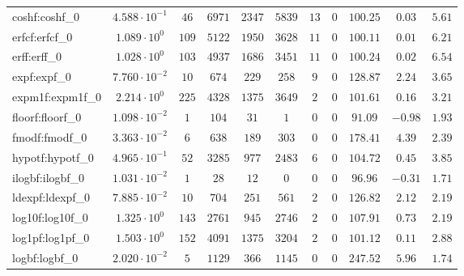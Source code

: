 \begin{tabular}{|l|c|c|c|c|c|c|c|c|c|c|}
coshf:coshf\_0               & $ 4.588 \cdot 10^{-1} $ & $ 46     $ & $ 6971   $ & $ 2347  $ & $ 5839  $ & $ 13  $ & $ 0 $ & $ 100.25      $ & $ 0.03    $ & $ 5.61    $ \\
erfcf:erfcf\_0               & $ 1.089 \cdot 10^{0}  $ & $ 109    $ & $ 5122   $ & $ 1950  $ & $ 3628  $ & $ 11  $ & $ 0 $ & $ 100.11      $ & $ 0.01    $ & $ 6.21    $ \\
erff:erff\_0                 & $ 1.028 \cdot 10^{0}  $ & $ 103    $ & $ 4937   $ & $ 1686  $ & $ 3451  $ & $ 11  $ & $ 0 $ & $ 100.24      $ & $ 0.02    $ & $ 6.54    $ \\
expf:expf\_0                 & $ 7.760 \cdot 10^{-2} $ & $ 10     $ & $ 674    $ & $ 229   $ & $ 258   $ & $ 9   $ & $ 0 $ & $ 128.87      $ & $ 2.24    $ & $ 3.65    $ \\
expm1f:expm1f\_0             & $ 2.214 \cdot 10^{0}  $ & $ 225    $ & $ 4328   $ & $ 1375  $ & $ 3649  $ & $ 2   $ & $ 0 $ & $ 101.61      $ & $ 0.16    $ & $ 3.21    $ \\
floorf:floorf\_0             & $ 1.098 \cdot 10^{-2} $ & $ 1      $ & $ 104    $ & $ 31    $ & $ 1     $ & $ 0   $ & $ 0 $ & $ 91.09       $ & $ -0.98   $ & $ 1.93    $ \\
fmodf:fmodf\_0               & $ 3.363 \cdot 10^{-2} $ & $ 6      $ & $ 638    $ & $ 189   $ & $ 303   $ & $ 0   $ & $ 0 $ & $ 178.41      $ & $ 4.39    $ & $ 2.39    $ \\
hypotf:hypotf\_0             & $ 4.965 \cdot 10^{-1} $ & $ 52     $ & $ 3285   $ & $ 977   $ & $ 2483  $ & $ 6   $ & $ 0 $ & $ 104.72      $ & $ 0.45    $ & $ 3.85    $ \\
ilogbf:ilogbf\_0             & $ 1.031 \cdot 10^{-2} $ & $ 1      $ & $ 28     $ & $ 12    $ & $ 0     $ & $ 0   $ & $ 0 $ & $ 96.96       $ & $ -0.31   $ & $ 1.71    $ \\
ldexpf:ldexpf\_0             & $ 7.885 \cdot 10^{-2} $ & $ 10     $ & $ 704    $ & $ 251   $ & $ 561   $ & $ 2   $ & $ 0 $ & $ 126.82      $ & $ 2.12    $ & $ 2.19    $ \\
log10f:log10f\_0             & $ 1.325 \cdot 10^{0}  $ & $ 143    $ & $ 2761   $ & $ 945   $ & $ 2746  $ & $ 2   $ & $ 0 $ & $ 107.91      $ & $ 0.73    $ & $ 2.19    $ \\
log1pf:log1pf\_0             & $ 1.503 \cdot 10^{0}  $ & $ 152    $ & $ 4091   $ & $ 1375  $ & $ 3204  $ & $ 2   $ & $ 0 $ & $ 101.12      $ & $ 0.11    $ & $ 2.88    $ \\
logbf:logbf\_0               & $ 2.020 \cdot 10^{-2} $ & $ 5      $ & $ 1129   $ & $ 366   $ & $ 1145  $ & $ 0   $ & $ 0 $ & $ 247.52      $ & $ 5.96    $ & $ 1.74    $ \\

\end{tabular}
